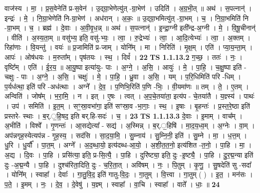 \documentclass[17pt]{extarticle}
\begin{document}
                  वाज॑स्य । मा॒ । प्र॒स॒वेनेति॑ प्र-स॒वेन॑ । उ॒द्ग्रा॒भेणेत्यु॑त् -ग्रा॒भेण॑ । उदिति॑ । अ॒ग्र॒भी॒त् ॥ अथ॑ । स॒पत्नान्॑ । इन्द्रः॑ । मे॒ । नि॒ग्रा॒भेणेति॑ नि-ग्रा॒भेण॑ । अध॑रान् । अ॒कः॒ ॥ उ॒द्ग्रा॒भमित्यु॑त् -ग्रा॒भम् । च॒ । नि॒ग्रा॒भमिति॑ नि -ग्रा॒भम् । च॒ । ब्रह्म॑ । दे॒वाः । अ॒वी॒वृ॒ध॒न्न् ॥ अथ॑ । स॒पत्नान्॑ । इ॒न्द्रा॒ग्नी इती᳚न्द्र-अ॒ग्नी । मे॒ । वि॒षू॒चीनान्॑ । वीति॑ । अ॒स्य॒ता॒म् ॥ वसु॑भ्य॒ इति॒ वसु॑-भ्यः॒ । त्वा॒ । रु॒द्रेभ्यः॑ । त्वा॒ । आ॒दि॒त्येभ्यः॑ । त्वा॒ । अ॒क्तम् । रिहा॑णाः । वि॒यन्तु॑ । वयः॑ ॥ प्र॒जामिति॑ प्र-जाम् । योनि᳚म् । मा । निरिति॑ । मृ॒क्ष॒म् । एति॑ । प्या॒य॒न्ता॒म् । आपः॑ । ओष॑धयः । म॒रुता᳚म् । पृष॑तयः । स्थ॒ । दिवं᳚ । \textbf{  22} \newline
                  \newline
                                \textbf{ TS 1.1.13.2} \newline
                  ग॒च्छ॒ । ततः॑ । नः॒ । वृष्टि᳚म् । एति॑ । ई॒र॒य॒ ॥ आ॒यु॒ष्पा इत्या॑युः- पाः । अ॒ग्ने॒ । अ॒सि॒ । आयुः॑ । मे॒ । पा॒हि॒ । च॒क्षु॒ष्पा इति॑ - चक्षुः - पाः । अ॒ग्ने॒ । अ॒सि॒ । चक्षुः॑ । मे॒ । पा॒हि॒ । ध्रु॒वा । अ॒सि॒ । यम् । प॒रि॒धिमिति॑ परि -धिम् । प॒र्यध॑त्था॒ इति॑ परि -अध॑त्थाः । अग्ने᳚ । दे॒व॒ । प॒णिभि॒रिति॑ प॒णि -भिः॒ । वी॒यमा॑णः ॥ तम् । ते॒ । ए॒तम् । अन्विति॑ । जोष᳚म् । भ॒रा॒मि॒ । न । इत् । ए॒षः । त्वत् । अ॒प॒चे॒तया॑ता॒ इत्य॑प - चे॒तया॑तै । य॒ज्ञ्स्य॑ । पाथः॑ । उप॑ । समिति॑ । इ॒त॒म् । सꣳ॒॒स्रा॒वभा॑गा॒ इति॑ सꣳस्रा॒व -भा॒गाः॒ । स्थ॒ । इ॒षाः । बृ॒हन्तः॑ । प्र॒स्त॒रे॒ष्ठा इति॑ प्रस्तरे- स्थाः । ब॒र्.॒हि॒षद॒ इति बर्.हि-सदः॑ । च॒ । \textbf{  23} \newline
                  \newline
                                \textbf{ TS 1.1.13.3} \newline
                  दे॒वाः । इ॒माम् । वाच᳚म् । अ॒भीति॑ । विश्वे᳚ । गृ॒णन्तः॑ । आ॒सद्येत्या᳚ - सद्य॑ । अ॒स्मिन्न् । ब॒र्.॒हिषि॑ । मा॒द॒य॒ध्व॒म् । अ॒ग्नेः । वा॒म् । अप॑न्नगृह॒स्येत्यप॑न्न - गृ॒ह॒स्य॒ । सद॑सि । सा॒द॒या॒मि॒ । सु॒म्नाय॑ । सु॒म्नि॒नी॒ इति॑ । सु॒म्ने । मा॒ । ध॒त्त॒म् । धु॒रि । धु॒र्यौ᳚ । पा॒त॒म् । अग्ने᳚ । अ॒द॒ब्धा॒यो॒ इत्य॑दब्ध-आ॒यो॒ । अ॒शी॒त॒त॒नो॒ इत्य॑शित -त॒नो॒ । पा॒हि । मा॒ । अ॒द्य । दि॒वः । पा॒हि । प्रसि॑त्या॒ इति॒ प्र-सि॒त्यै॒ । पा॒हि । दुरि॑ष्ट्या॒ इति॒ दुः -इ॒ष्ट्यै॒ । पा॒हि । दु॒र॒द्म॒न्या इति॑ दुः -अ॒द्म॒न्यै । पा॒हि । दुश्च॑रिता॒दिति॒ दुः - च॒रि॒ता॒त् । अवि॑षम् । नः॒ । पि॒तुम् । कृ॒णु॒ । सु॒षदेति॑ सु -सदा᳚ । योनि᳚म् । स्वाहा᳚ । देवाः᳚ । गा॒तु॒वि॒द॒ इति॑ गातु-वि॒दः॒ । गा॒तुम् । वि॒त्त्वा । गा॒तुम् ( ) । इ॒त॒ । मन॑सः । प॒ते॒ । इ॒मम् । नः॒ । दे॒व॒ । दे॒वेषु॑ । य॒ज्ञ्म् । स्वाहा᳚ । वा॒चि । स्वाहा᳚ । वाते᳚ । धाः॒ ॥ \textbf{  24} \newline
\end{document}
